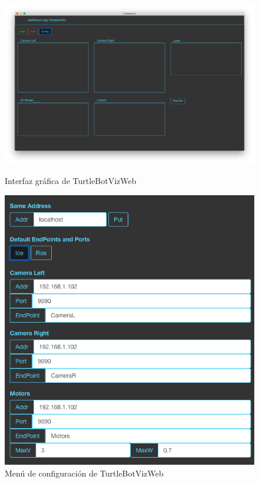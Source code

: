 \begin{figure}
\centering
  \begin{minipage}{0.45\textwidth}
    \centering
    \includegraphics[width=1\textwidth]{figures/interfazTurtleBotviz.png}
    \caption{Interfaz gráfica de TurtleBotVizWeb}
    \label{fig.iterfazTurtleBotviz}
  \end{minipage}%
  \hspace{5mm}
  \begin{minipage}{0.45\textwidth}
    \centering
    \includegraphics[width=1\textwidth]{figures/configTurtleBot.png}
    \caption{Menú de configuración de TurtleBotVizWeb}
    \label{fig.configTurtleBot}
  \end{minipage}
\end{figure}

